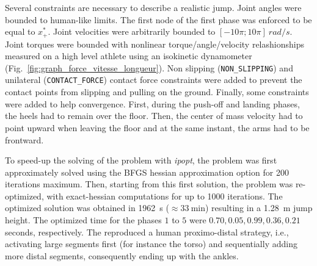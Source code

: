 Several constraints are necessary to describe a realistic jump.
Joint angles were bounded to human-like limits.
The first node of the first phase was enforced to be equal to $x_+^*$. 
Joint velocities were arbitrarily bounded to $[-10 \pi; 10 \pi]~rad/s$.
Joint torques were bounded with nonlinear torque/angle/velocity relashionships measured on a high level athlete using an isokinetic dynamometer (Fig.~\ref{fig:graph_force_vitesse_longueur}). 
Non slipping (\texttt{NON\_SLIPPING}) and unilateral (\texttt{CONTACT\_FORCE}) contact force constraints were added to prevent the contact points from slipping and pulling on the ground.
Finally, some constraints were added to help convergence.
First, during the push-off and landing phases, the heels had to remain over the floor.
Then, the center of mass velocity had to point upward when leaving the floor and at the same instant, the arms had to be frontward. 

To speed-up the solving of the problem with \emph{ipopt}, the problem was first approximately solved using the BFGS hessian approximation option for 200 iterations maximum.
Then, starting from this first solution, the problem was re-optimized, with exact-hessian computations for up to 1000 iterations.
The optimized solution was obtained in \SI{1962}{\second} ($\approx\SI{33}{\minute}$) resulting in a \SI{1.28}{\meter} jump height.
The optimized time for the phases $1$ to $5$ were $0.70, 0.05, 0.99, 0.36, 0.21$ seconds, respectively.
The  reproduced a human proximo-distal strategy, i.e., activating large segments first (for instance the torso) and sequentially adding more distal segments, consequently ending up with the ankles.

